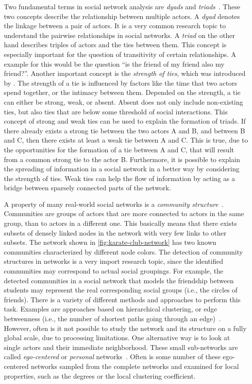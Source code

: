 Two fundamental terms in social network analysis are \emph{dyads} and \emph{triads}~\cite{Wasserman1994}.
These two concepts describe the relationship between multiple actors.
A \emph{dyad} denotes the linkage between a pair of actors.
It is a very common research topic to understand the pairwise relationships in social networks.
A \emph{triad} on the other hand describes triples of actors and the ties between them.
This concept is especially important for the question of transitivity of certain relationships.
A example for this would be the question \enquote{is the friend of my friend also my friend?}.
Another important concept is the \emph{strength of ties}, which was introduced by \citet{Granovetter1973}.
The strength of a tie is influenced by factors like the time that two actors spend together, or the intimacy between them.
Depended on the strength, a tie can either be strong, weak, or absent.
Absent does not only include non-existing ties, but also ties that are below some threshold of social interactions.
This concept of strong and weak ties can be used to explain the formation of triads.
If there already exists a strong tie between the two actors A and B, and between B and C, then there exists at least a weak tie between A and C.
This is true, due to the opportunities for the formation of a tie between A and C, that will result from a common strong tie to the actor B.
Furthermore, it is possible to explain the spreading of information in a social network in a better way by considering the strength of ties.
Weak ties can help the flow of information by acting as a bridge between sparsely connected parts of the network.

A property of many real-world social networks is a \emph{community structure}~\cite{Girvan2002}.
Communities are groups of actors that are more connected to actors in the same group, than to actors in a different one.
This basically means that there exists subsets of densely linked nodes in the network with very few links to other subsets.
The network shown in \autoref{fig:karate-club-network} has two known communities characterized by different node colors.
The detection of community structures in networks is a very import research topic, since the identified communities may correspond to actual social groupings.
For example, the detected communities in a social network that models the friendship between students may represent the real corresponding social groups (i.e., the circles of friends).
There is a variety of different methods and approaches to perform this task.
Examples are approaches based on hierarchical clustering, or edge betweenness (i.e., the number of shortest paths going through an edge)~\cite{Fortunato2010}.
However, often is it not possible to study the network and its structure on a fully global scale, due to processing limitations.
One alternative way is to look at single actors and their immediate neighborhood.
These small sub-networks are called \emph{ego-centered} or \emph{personal} networks~\cite{Newman2010}.
Often is some number of these ego-centered networks sampled from the complete networks and examined for local properties, such as the degrees or the local clustering coefficient.

